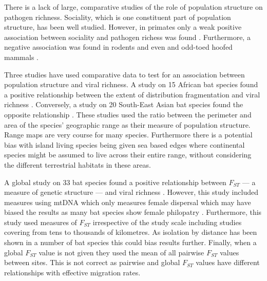

There is a lack of large, comparative studies of the role of population structure on pathogen richness.
Sociality, which is one constituent part of population structure, has been well studied.
However, in primates only a weak positive association between sociality and pathogen richess was found \cite{vitone2004body}.
Furthermore, a negative association was found in rodents \cite{bordes2007rodent} and even and odd-toed hoofed mammals \cite{ezenwa2006host}.









Three studies have used comparative data to test for an association between population structure and viral richness.
A study on 15 African bat species found a positive relationship between the extent of distribution fragmentation and viral richness \cite{maganga2014bat}.
Conversely, a study on 20 South-East Asian bat species found the opposite relationship \cite{gay2014parasite}. 
These studies used the ratio between the perimeter and area of the species' geographic range as their measure of population structure.
Range maps are very course for many species.
Furthermore there is a potential bias with island living species being given sea based edges where continental species might be assumed to live across their entire range, without considering the different terrestrial habitats in these areas.

A global study on 33 bat species found a positive relationship between $F_{ST}$ --- a measure of genetic structure --- and viral richness \cite{turmelle2009correlates}. 
However, this study included measures using mtDNA which only measures female dispersal which may have biased the results as many bat species show female philopatry \cite{kerth2002extreme, hulva2010mechanisms}.
Furthermore, this study used measures of $F_{ST}$ irrespective of the study scale including studies covering from tens \cite{mccracken1981social} to thousands \cite{petit1999male} of kilometres.
As isolation by distance has been shown in a number of bat species \cite{burland1999population, hulva2010mechanisms, o2015genetic, vonhof2015range} this could bias results further.
Finally, when a global $F_{ST}$ value is not given they used the mean of all pairwise $F_{ST}$ values between sites.
This is not correct as pairwise and global $F_{ST}$ values have different relationships with effective migration rates. 

